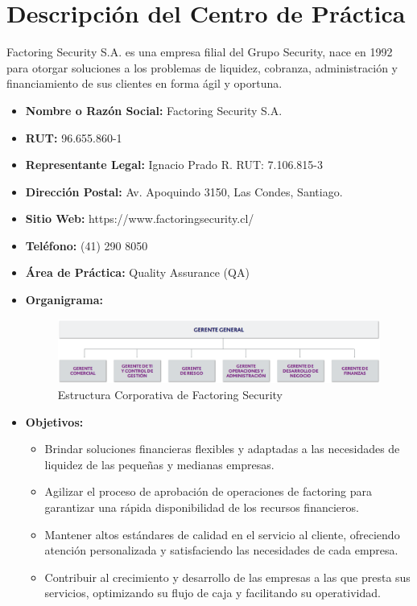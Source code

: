 \documentclass[12pt,a4paper]{report}
\begin{document}
\section{Descripción del Centro de Práctica}
Factoring Security S.A. es una empresa filial del Grupo Security, nace en 1992 para otorgar soluciones a los problemas de liquidez, cobranza, administración y financiamiento de sus clientes en forma ágil y oportuna.
\begin{itemize}
    \item \textbf{Nombre o Razón Social:} Factoring Security S.A.
    \item \textbf{RUT:} 96.655.860-1
    \item \textbf{Representante Legal:} Ignacio Prado R. RUT: 7.106.815-3
    \item \textbf{Dirección Postal:} Av. Apoquindo 3150, Las Condes, Santiago.
    \item \textbf{Sitio Web:} https://www.factoringsecurity.cl/
    \item \textbf{Teléfono:} (41) 290 8050
    \item \textbf{Área de Práctica:} Quality Assurance (QA)
    \item \textbf{Organigrama:} \begin{figure}[H]
      \centering
      \includegraphics[width=14cm]{images/organigrama.png}
      \caption{Estructura Corporativa de Factoring Security}
    \end{figure}
    \item \textbf{Objetivos:}
    \begin{itemize}
        \item Brindar soluciones financieras flexibles y adaptadas a las necesidades de liquidez de las pequeñas y medianas empresas.
        \item Agilizar el proceso de aprobación de operaciones de factoring para garantizar una rápida disponibilidad de los recursos financieros.
        \item Mantener altos estándares de calidad en el servicio al cliente, ofreciendo atención personalizada y satisfaciendo las necesidades de cada empresa.
        \item Contribuir al crecimiento y desarrollo de las empresas a las que presta sus servicios, optimizando su flujo de caja y facilitando su operatividad.

\end{itemize}
\end{itemize}
\end{document}

